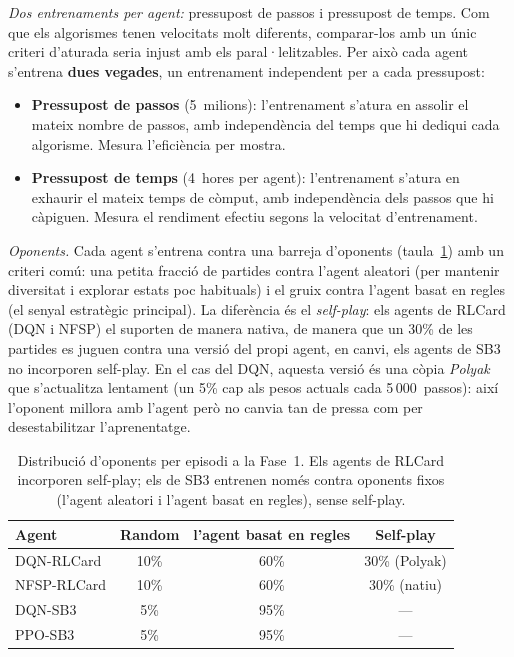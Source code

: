 \emph{Dos entrenaments per agent:} pressupost de passos i pressupost de temps. Com que els
algorismes tenen velocitats molt diferents, comparar-los amb un únic criteri d'aturada seria
injust amb els paral·lelitzables. Per això cada agent s'entrena \textbf{dues vegades}, un
entrenament independent per a cada pressupost:
\begin{itemize}
  \item \textbf{Pressupost de passos} (5~milions): l'entrenament s'atura en assolir el
        mateix nombre de passos, amb independència del temps que hi dediqui cada algorisme.
        Mesura l'eficiència per mostra.
  \item \textbf{Pressupost de temps} (4~hores per agent): l'entrenament s'atura en exhaurir
        el mateix temps de còmput, amb independència dels passos que hi càpiguen. Mesura el
        rendiment efectiu segons la velocitat d'entrenament.
\end{itemize}

\emph{Oponents.} Cada agent s'entrena contra una barreja d'oponents
(taula~\ref{tab:fase1-oponents}) amb un criteri comú: una petita fracció de partides
contra l'agent aleatori (per mantenir diversitat i explorar estats poc habituals) i el
gruix contra l'agent basat en regles (el senyal estratègic principal). La diferència és el
\emph{self-play}: els agents de RLCard (DQN i NFSP) el suporten de manera nativa, de manera
que un 30\% de les partides es juguen contra una versió del propi agent, en canvi, els agents de \ac{SB3} no incorporen self-play. En el cas del DQN,
aquesta versió és una còpia \emph{Polyak} que s'actualitza lentament (un 5\% cap als pesos
actuals cada 5\,000~passos): així l'oponent millora amb l'agent però no canvia tan de
pressa com per desestabilitzar l'aprenentatge.

\begin{table}[H]
  \centering
  \begin{tabular}{lccc}
    \toprule
    Agent & Random & l'agent basat en regles & Self-play \\
    \midrule
    DQN-RLCard  & 10\%      & 60\%       & 30\% (Polyak) \\
    NFSP-RLCard & 10\%      & 60\%       & 30\% (natiu) \\
    DQN-SB3     & 5\%       & 95\%       & — \\
    PPO-SB3     & 5\%       & 95\%       & — \\
    \bottomrule
  \end{tabular}
  \caption{Distribució d'oponents per episodi a la Fase~1. Els agents de RLCard
           incorporen self-play; els de \ac{SB3} entrenen només contra oponents fixos
           (l'agent aleatori i l'agent basat en regles), sense self-play.}
  \label{tab:fase1-oponents}
\end{table}

